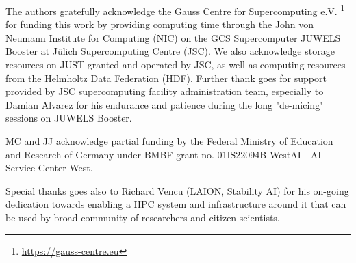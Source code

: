 \documentclass[11pt,table]{article}
\newcommand{\citep}{\cite}
\begin{document}
The authors gratefully acknowledge the Gauss Centre for Supercomputing e.V. \footnote{\url{https://gauss-centre.eu}} for funding this work by providing computing time through the John von Neumann Institute for Computing (NIC) on the GCS Supercomputer JUWELS Booster \citep{JUWELSBooster2020} at Jülich Supercomputing Centre (JSC). We also acknowledge storage resources on JUST \citep{graf2021just} granted and operated by JSC, as well as computing resources from the Helmholtz Data Federation (HDF). Further thank goes for support provided by JSC supercomputing facility administration team, especially to Damian Alvarez for his endurance and patience during the long "de-micing" sessions on JUWELS Booster.

MC and JJ acknowledge partial funding by the Federal Ministry of Education and Research of Germany under BMBF grant no. 01IS22094B WestAI - AI Service Center West.

Special thanks goes also to Richard Vencu (LAION, Stability AI) for his on-going dedication towards enabling a HPC system and infrastructure around it that can be used by broad community of researchers and citizen scientists. 

{\small


}

\clearpage

\end{document}
